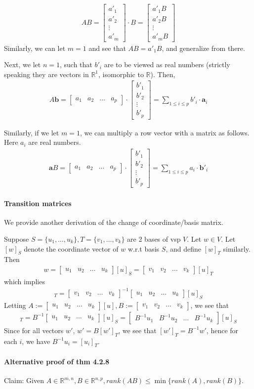 \documentclass{article}
\newcommand{\colMat}[2]{\begin{bmatrix}
	{#1}_1 & {#1}_2 & \dots & {#1}_{#2}
\end{bmatrix}}
\newcommand{\rowMat}[2]{\begin{bmatrix}
	{#1}'_1 \\ {#1}'_2 \\ \vdots \\ {#1}'_{#2}
\end{bmatrix}}
\begin{document}
\begin{align*}
	AB = \rowMat{a}{m}\cdot B = \begin{bmatrix}
	a'_1B\\ a'_2B\\ \vdots \\ a'_mB
	\end{bmatrix}
\end{align*}
Similarly, we can let $m=1$ and see that $AB = a'_1B$, and generalize from there.

Next, we let $n=1$, such that $b'_i$ are to be viewed as real numbers (strictly speaking they are vectors in $\mathbb{R}^1$, isomorphic to $\mathbb{R}$). Then,
\begin{align*}
	A\mathbf{b} = \colMat{a}{p} \cdot \rowMat{b}{p} = \sum_{1\leq i\leq p} b'_i\cdot \mathbf{a}_i
\end{align*}

Similarly, if we let $m=1$, we can multiply a row vector with a matrix as follows. Here $a_i$ are real numbers.
\begin{align*}
	\mathbf{a}B = \colMat{a}{p}\cdot \rowMat{b}{p} = \sum_{1\leq i\leq p} a_i\cdot \mathbf{b}'_i
\end{align*}

\paragraph{Transition matrices} We provide another derivation of the change of coordinate/basis matrix.

Suppose $S = \{u_1, \dots, u_k\}, T = \{v_1, \dots, v_k\}$ are 2 bases of vsp $V$. Let $w\in V$. Let $[w]_S$ denote the coordinate vector of $w$ w.r.t basis $S$, and define $[w]_T$ similarly. Then
\begin{align*}
	w = \colMat{u}{k}[u]_S = \colMat{v}{k}[u]_T
\end{align*}
which implies
\begin{align*}
	[u]_T = \colMat{v}{k}^{-1}\colMat{u}{k}[u]_S
\end{align*}
Letting $A:=\colMat{u}{k}[u], B:=\colMat{v}{k}$, we see that
\begin{align*}
	[u]_T = B^{-1}\colMat{u}{k}[u]_S = \colMat{B^{-1}u}{k}[u]_S
\end{align*}
Since for all vectors $w'$, $w'=B[w']_T$, we see that $[w']_T = B^{-1}w'$, hence for each $i$, we have $B^{-1}u_i = [u_i]_T$.

\paragraph{Alternative proof of thm 4.2.8} Claim: Given $A\in \mathbb{R}^{m,n}, B\in \mathbb{R}^{n,p}, rank(AB) \leq \min \{rank(A), rank(B)\}$.
\end{document}
